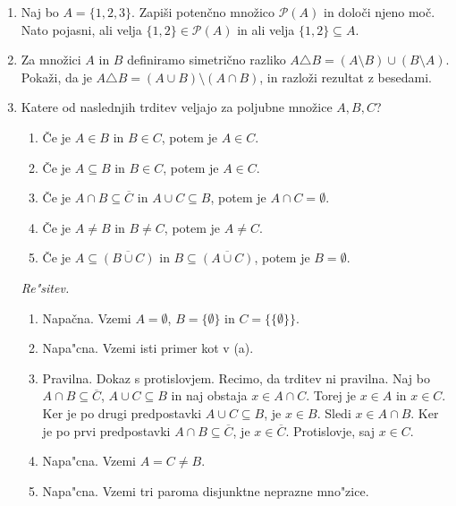 \documentclass[11pt,paper=b5,DIV=13,headinclude,footinclude]{scrbook}
\begin{document}
\begin{enumerate}
\item {\color{red}Naj bo $A=\{1,2,3\}$. Zapiši potenčno množico
$\mathcal{P}(A)$ in določi njeno moč. Nato pojasni, ali velja
$\{1,2\}\in\mathcal{P}(A)$ in ali velja $\{1,2\}\subseteq A$.}

\item {\color{red}Za množici $A$ in $B$ definiramo simetrično razliko
$A\triangle B=(A\setminus B)\cup(B\setminus A)$. Pokaži, da je
$A\triangle B=(A\cup B)\setminus(A\cap B)$, in razloži rezultat z besedami.}

\item {\color{blue}Katere od naslednjih trditev veljajo za poljubne množice
$A,B,C$?}
\begin{enumerate}
\item {\color{blue}Če je $A\in B$ in $B\in C$, potem je $A\in C$.}
\item {\color{blue}Če je $A\subseteq B$ in $B\in C$, potem je $A\in C$.}
\item {\color{blue}Če je $A\cap B\subseteq \overline{C}$ in $A\cup C\subseteq B$, potem je $A\cap C=\emptyset$.}
\item {\color{blue}Če je $A\neq B$ in $B\neq C$, potem je $A\neq C$.}
\item {\color{blue}Če je $A\subseteq \overline{(B\cup C)}$ in $B\subseteq \overline{(A\cup C)}$, potem je $B=\emptyset$.}
\end{enumerate}

\emph{ Re"sitev.}
\begin{enumerate}
\item Napačna. Vzemi $A=\emptyset$, $B=\{\emptyset\}$ in $C=\{\{\emptyset\}\}$.
\item Napa"cna. Vzemi isti primer kot v (a).
\item Pravilna. Dokaz s protislovjem. Recimo, da trditev ni pravilna. Naj bo $A\cap B\subseteq \overline{C}$, $A\cup C\subseteq B$  in naj obstaja $x\in A\cap C$. Torej je $x\in A$ in $x\in C$. Ker je po drugi predpostavki $A\cup C\subseteq B$, je $x\in B$. Sledi $x\in A \cap B$. Ker je po prvi predpostavki $A\cap B\subseteq \overline{C}$, je $x\in \overline{C}$. Protislovje, saj $x\in C$. 
\item Napa"cna. Vzemi $A=C\neq B$.
\item Napa"cna. Vzemi tri paroma disjunktne neprazne mno"zice.
\end{enumerate}

\end{enumerate}
\end{document}
